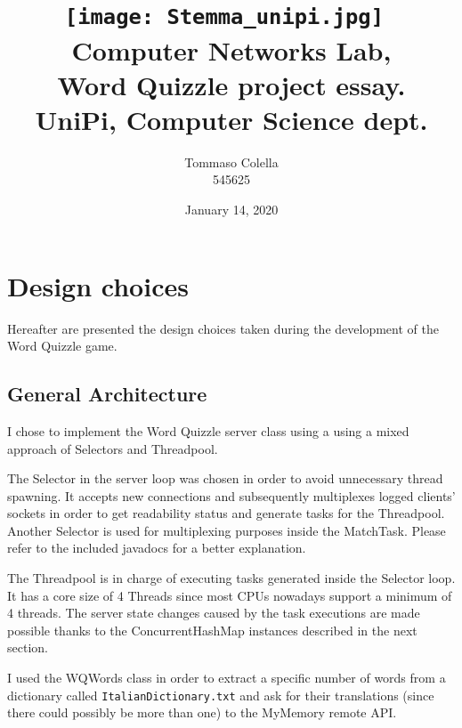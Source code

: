 \documentclass[a4paper,11pt]{article}
\begin{document}
\begin{titlepage}



\title{%
\texttt{[image: Stemma\_unipi.jpg]}~ 
\\[1cm]
Computer Networks Lab,
\\Word Quizzle project essay.
\\UniPi, Computer Science dept.
}
\author{Tommaso Colella
\\ 545625}
\date{January 14, 2020}
\maketitle
\thispagestyle{empty}
\tableofcontents
\end{titlepage}

\newpage

\section{Design choices}
Hereafter are presented the design choices taken during the development of the Word Quizzle game.

\subsection{General Architecture}
I chose to implement the Word Quizzle server class using a using a mixed approach of Selectors and Threadpool. 

The Selector in the server loop was chosen in order to avoid unnecessary thread spawning. It accepts new connections and subsequently multiplexes logged clients' sockets in order to get readability status and generate tasks for the Threadpool.
Another Selector is used for multiplexing purposes inside the MatchTask. Please refer to the included javadocs for a better explanation.

The Threadpool is in charge of executing tasks generated inside the Selector loop. It has a core size of 4 Threads since most CPUs nowadays support a minimum of 4 threads. The server state changes caused by the task executions are made possible thanks to the ConcurrentHashMap instances  described in the next section.

I used the WQWords class in order to extract a specific number of words from a dictionary called \texttt{ItalianDictionary.txt} and ask for their translations (since there could possibly be more than one) to the MyMemory remote API.
\end{document}
